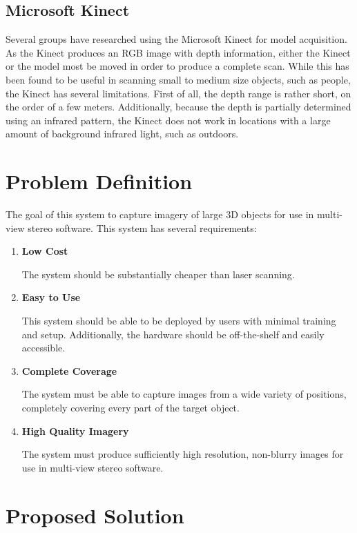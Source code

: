 \subsection{Microsoft Kinect}

Several groups have researched using the Microsoft Kinect for model acquisition. As the Kinect produces an RGB image with depth information, either the Kinect or the model most be moved in order to produce a complete scan. While this has been found to be useful in scanning small to medium size objects, such as people, the Kinect has several limitations. First of all, the depth range is rather short, on the order of a few meters. Additionally, because the depth is partially determined using an infrared pattern, the Kinect does not work in locations with a large amount of background infrared light, such as outdoors.


\section{Problem Definition}
The goal of this system to capture imagery of large 3D objects for use in multi-view stereo software. This system has several requirements:

\begin{enumerate}
\item
\textbf{Low Cost}

The system should be substantially cheaper than laser scanning.

\item
\textbf{Easy to Use}

This system should be able to be deployed by users with minimal training and setup. Additionally, the hardware should be off-the-shelf and easily accessible.

\item
\textbf{Complete Coverage}

The system must be able to capture images from a wide variety of positions, completely covering every part of the target object.

\item
\textbf{High Quality Imagery}

The system must produce sufficiently high resolution, non-blurry images for use in multi-view stereo software.

\end{enumerate}

\section{Proposed Solution}

